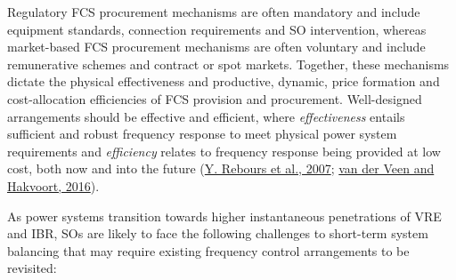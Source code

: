 \documentclass[12pt,a4paper,]{report}
\begin{document}
Regulatory FCS procurement mechanisms are often mandatory and include
equipment standards, connection requirements and SO intervention,
whereas market-based FCS procurement mechanisms are often voluntary and
include remunerative schemes and contract or spot markets. Together,
these mechanisms dictate the physical effectiveness and productive,
dynamic, price formation and cost-allocation efficiencies of FCS
provision and procurement. Well-designed arrangements should be
effective and efficient, where \emph{effectiveness} entails sufficient
and robust frequency response to meet physical power system requirements
and \emph{efficiency} relates to frequency response being provided at
low cost, both now and into the future
(\protect\hyperlink{ref-reboursFundamentalDesignIssues2007}{Y. Rebours
et al., 2007};
\protect\hyperlink{ref-vanderveenElectricityBalancingMarket2016}{van der
Veen and Hakvoort, 2016}).

As power systems transition towards higher instantaneous penetrations of
VRE and IBR, SOs are likely to face the following challenges to
short-term system balancing that may require existing frequency control
arrangements to be revisited:
\end{document}
